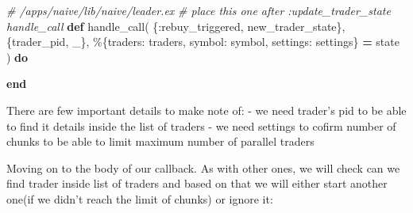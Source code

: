 \documentclass[
  oneside]{book}
\newenvironment{Shaded}{\begin{snugshade}}{\end{snugshade}}
\newcommand{\CommentTok}[1]{\textcolor[rgb]{0.56,0.35,0.01}{\textit{#1}}}
\newcommand{\KeywordTok}[1]{\textcolor[rgb]{0.13,0.29,0.53}{\textbf{#1}}}
\newcommand{\NormalTok}[1]{#1}
\newcommand{\OperatorTok}[1]{\textcolor[rgb]{0.81,0.36,0.00}{\textbf{#1}}}
\newcommand{\VariableTok}[1]{\textcolor[rgb]{0.00,0.00,0.00}{#1}}
\begin{document}
\begin{Shaded}
\begin{Highlighting}[]
  \CommentTok{\# /apps/naive/lib/naive/leader.ex}
  \CommentTok{\# place this one after :update\_trader\_state handle\_call}
  \KeywordTok{def}\NormalTok{ handle\_call(}
\NormalTok{        \{}\VariableTok{:rebuy\_triggered}\NormalTok{, new\_trader\_state\},}
\NormalTok{        \{trader\_pid, \_\},}
\NormalTok{        \%\{}\VariableTok{traders:}\NormalTok{ traders, }\VariableTok{symbol:}\NormalTok{ symbol, }\VariableTok{settings:}\NormalTok{ settings\} }\OperatorTok{=}\NormalTok{ state}
\NormalTok{      ) }\KeywordTok{do}

  \KeywordTok{end}
\end{Highlighting}
\end{Shaded}

There are few important details to make note of:
- we need trader's pid to be able to find it details inside the list of traders
- we need settings to cofirm number of chunks to be able to limit maximum number of parallel traders

Moving on to the body of our callback. As with other ones, we will check can we find trader inside list of traders and based on that we will either start another one(if we didn't reach the limit of chunks) or ignore it:
\end{document}
